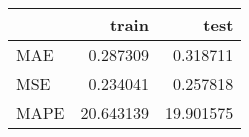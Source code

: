 \begin{tabular}{lrr}
\toprule
{} &      train &       test \\
\midrule
MAE  &   0.287309 &   0.318711 \\
MSE  &   0.234041 &   0.257818 \\
MAPE &  20.643139 &  19.901575 \\
\bottomrule
\end{tabular}

